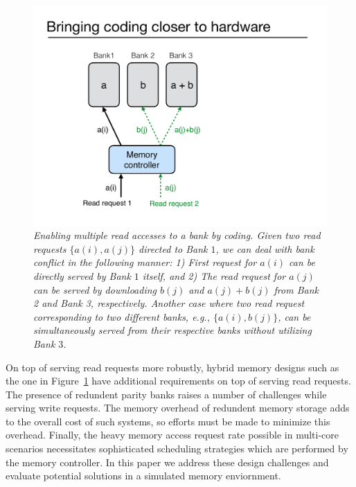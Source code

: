 \begin{figure}[t!]
\centering
\includegraphics[width=0.395\linewidth]{fig/example-xor.pdf}
\caption{\it{Enabling multiple read accesses to a bank by coding. Given two read requests $\{a(i), a(j)\}$ directed to Bank $1$, we can deal with bank conflict in the following manner: 1) First request for $a(i)$ can be directly served by Bank $1$ itself, and 2) The read request for $a(j)$ can be served by downloading $b(j)$ and $a(j) + b(j)$ from Bank 2 and Bank 3, respectively. Another case where two read request corresponding to two different banks, e.g., $\{a(i), b(j)\}$, can be simultaneously served from their respective banks without utilizing Bank $3$.}}
\label{fig:example_xor}
\end{figure}
On top of serving read requests more robustly, hybrid memory designs such as the one in Figure~\ref{fig:example_xor} have additional requirements on top of serving read requests. The presence of redundent parity banks raises a number of challenges while serving write requests. The memory overhead of redundent memory storage adds to the overall cost of such systems, so efforts must be made to minimize this overhead. Finally, the heavy memory access request rate possible in multi-core scenarios necessitates sophisticated scheduling strategies which are performed by the memory controller. In this paper we address these design challenges and evaluate potential solutions in a simulated memory enviornment. 

